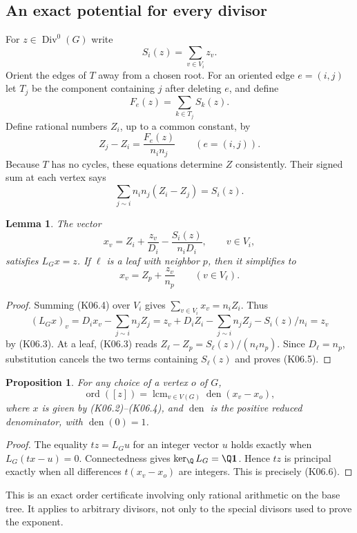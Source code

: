 \documentclass[11pt,a4paper]{article}
\newtheorem{lemma}[theorem]{Lemma}
\newtheorem{proposition}[theorem]{Proposition}
\theoremstyle{definition}\newtheorem{definition}[theorem]{Definition}
\theoremstyle{remark}\newtheorem{remark}[theorem]{Remark}
\DeclareMathOperator{\ord}{ord}\DeclareMathOperator{\lcm}{lcm}\DeclareMathOperator{\im}{im}
\numberwithin{equation}{section}
\begin{document}
\subsection{An exact potential for every divisor}\label{K06-sec-2}
For $z\in\operatorname{Div}^0(G)$ write
\[
 S_i(z)=\sum_{v\in V_i}z_v.
\]
Orient the edges of $T$ away from a chosen root. For an oriented edge $e=(i,j)$ let $T_j$ be the component containing $j$ after deleting $e$, and define
\[
 F_e(z)=\sum_{k\in T_j}S_k(z).
\]
Define rational numbers $Z_i$, up to a common constant, by
\[
 Z_j-Z_i=\frac{F_e(z)}{n_in_j}\qquad(e=(i,j)).                \tag{K06.2}
\]
Because $T$ has no cycles, these equations determine $Z$ consistently. Their signed sum at each vertex says
\[
 \sum_{j\sim i}n_in_j(Z_i-Z_j)=S_i(z).                       \tag{K06.3}
\]
\begin{lemma}\label{K06-potential}
The vector
\[
 x_v=Z_i+\frac{z_v}{D_i}-\frac{S_i(z)}{n_iD_i},
                 \qquad v\in V_i,                           \tag{K06.4}
\]
satisfies $L_Gx=z$. If $\ell$ is a leaf with neighbor $p$, then it simplifies to
\[
 x_v=Z_p+\frac{z_v}{n_p}\qquad(v\in V_\ell).                 \tag{K06.5}
\]
\end{lemma}
\begin{proof}
Summing (K06.4) over $V_i$ gives $\sum_{v\in V_i}x_v=n_iZ_i$. Thus
\[
 (L_Gx)_v=D_ix_v-\sum_{j\sim i}n_jZ_j
 =z_v+D_iZ_i-\sum_{j\sim i}n_jZ_j-S_i(z)/n_i=z_v
\]
by (K06.3). At a leaf, (K06.3) reads
$Z_\ell-Z_p=S_\ell(z)/(n_\ell n_p)$. Since $D_\ell=n_p$, substitution cancels the two terms containing $S_\ell(z)$ and proves (K06.5).
\end{proof}

\begin{proposition}\label{K06-order}
For any choice of a vertex $o$ of $G$,
\[
 \ord([z])=\lcm_{v\in V(G)}\operatorname{den}(x_v-x_o),       \tag{K06.6}
\]
where $x$ is given by (K06.2)--(K06.4), and $\operatorname{den}$ is the positive reduced denominator, with $\operatorname{den}(0)=1$.
\end{proposition}
\begin{proof}
The equality $tz=L_Gu$ for an integer vector $u$ holds exactly when $L_G(tx-u)=0$. Connectedness gives $\ker_{\Q}L_G=\Q\boldsymbol1$. Hence $tz$ is principal exactly when all differences $t(x_v-x_o)$ are integers. This is precisely (K06.6).
\end{proof}
This is an exact order certificate involving only rational arithmetic on the base tree. It applies to arbitrary divisors, not only to the special divisors used to prove the exponent.
\end{document}
